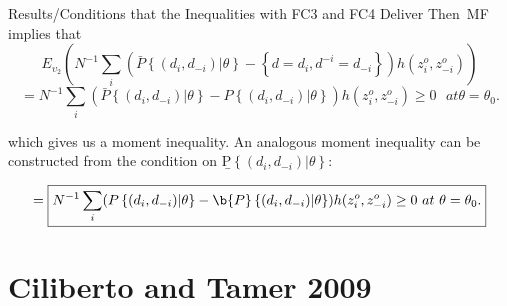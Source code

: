 \documentclass[xcolor=pdftex,dvipsnames,table,mathserif]{beamer}
\begin{document}
\begin{frame}{\normalsize Results/Conditions that the Inequalities with FC3 and FC4 Deliver}
 Then\ MF implies that%
\begin{equation*}
E_{\upsilon _{2}}(N^{-1}\sum_{i}(\bar{P}\left\{ (d_{i},d_{-i})|\theta
\right\} -\left\{ d=d_{i},d^{-i}=d_{-i}\right\} )h(z_{i}^{o},z_{-i}^{o}))
\end{equation*}%
\begin{equation*}
=\boxed{N^{-1}\sum_{i}(\bar{P}\left\{ (d_{i},d_{-i})|\theta \right\} -P\left\{
(d_{i},d_{-i})|\theta \right\} )h(z_{i}^{o},z_{-i}^{o})\geq 0\text{ }at\text{
}\theta =\theta _{0}\text{.}}
\end{equation*}

which gives us a moment inequality. An analogous moment inequality can be
constructed from the condition on \b{P}$\left\{ (d_{i},d_{-i})|\theta
\right\}$:

\begin{equation*}
=\boxed{N^{-1}\sum_{i}(P\left\{(d_{i},d_{-i})|\theta \right\} - \b{P}\left\{ (d_{i},d_{-i})|\theta \right\})
h(z_{i}^{o},z_{-i}^{o})\geq 0\text{ }at\text{
}\theta =\theta _{0}\text{.}}
\end{equation*}
\end{frame}


\section{Ciliberto and Tamer 2009}
\end{document}
